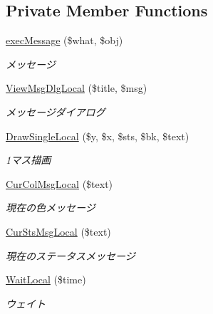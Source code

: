 \subsection*{Private Member Functions}
\begin{DoxyCompactItemize}
\item 
\hyperlink{class_reversi_play_ae8beea2648c1c5cf722364e84a90edf9}{exec\+Message} (\$what, \$obj)
\begin{DoxyCompactList}\small\item\em メッセージ \end{DoxyCompactList}\item 
\hyperlink{class_reversi_play_a2212d70313710a13422dd4fcb5da9cde}{View\+Msg\+Dlg\+Local} (\$title, \$msg)
\begin{DoxyCompactList}\small\item\em メッセージダイアログ \end{DoxyCompactList}\item 
\hyperlink{class_reversi_play_af0649b9d4a899e0802c739928136de99}{Draw\+Single\+Local} (\$y, \$x, \$sts, \$bk, \$text)
\begin{DoxyCompactList}\small\item\em 1マス描画 \end{DoxyCompactList}\item 
\hyperlink{class_reversi_play_aa217a221907e90c97719f8332c60a6d6}{Cur\+Col\+Msg\+Local} (\$text)
\begin{DoxyCompactList}\small\item\em 現在の色メッセージ \end{DoxyCompactList}\item 
\hyperlink{class_reversi_play_ae3da8fb1a3a365c6e5254e5cf6f1e7bc}{Cur\+Sts\+Msg\+Local} (\$text)
\begin{DoxyCompactList}\small\item\em 現在のステータスメッセージ \end{DoxyCompactList}\item 
\hyperlink{class_reversi_play_a58884d8de55d9faeac653fcf6d4f48b3}{Wait\+Local} (\$time)
\begin{DoxyCompactList}\small\item\em ウェイト \end{DoxyCompactList}\end{DoxyCompactItemize}
